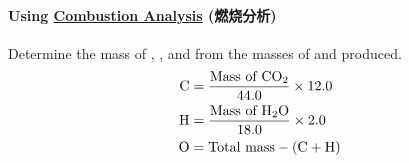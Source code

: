 \paragraph{Using \underline{Combustion Analysis} (燃烧分析)}
Determine the mass of , , and  from the masses of  and  produced.
\begin{equation}
    \begin{split}
        \ce{C} &= \frac{\text{Mass of } \ce{CO2}}{44.0} \times 12.0 \\
        \ce{H} &= \frac{\text{Mass of } \ce{H2O}}{18.0} \times 2.0 \\
        \ce{O} &= \text{Total mass} - \left(\ce{C} + \ce{H}\right)
    \end{split}
\end{equation}